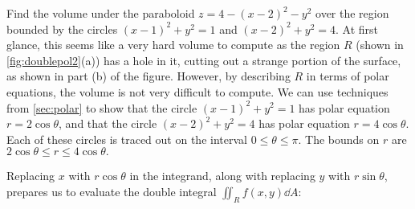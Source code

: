 \begin{example}\label{ex_doublepol2}
Find the volume under the paraboloid $z=4-(x-2)^2-y^2$ over the region bounded by the circles $(x-1)^2+y^2=1$ and $(x-2)^2+y^2=4$.
\solution
At first glance, this seems like a very hard volume to compute as the region $R$ (shown in \autoref{fig:doublepol2}(a)) has a hole in it, cutting out a strange portion of the surface, as shown in part (b) of the figure. However, by describing $R$ in terms of polar equations, the volume is not very difficult to compute. We can use techniques from \autoref{sec:polar} to show that the circle $(x-1)^2+y^2=1$ has polar equation $r=2\cos\theta$, and that the circle $(x-2)^2+y^2=4$ has polar equation $r=4\cos\theta$. Each of these circles is traced out on the interval $0\leq\theta\leq\pi$. The bounds on $r$ are $2\cos\theta\leq r\leq 4\cos\theta.$ 

Replacing $x$ with $r\cos\theta$ in the integrand, along with replacing $y$ with $r\sin \theta$, prepares us to evaluate the double integral $\iint_Rf(x,y)\dd A$:


\end{example}
